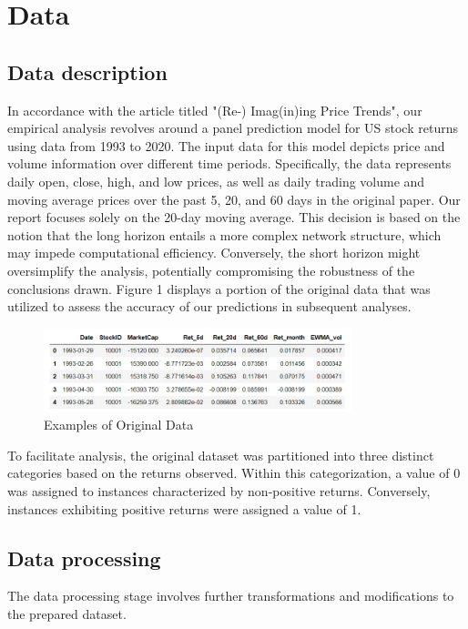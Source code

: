 \documentclass{article}
\begin{document}
\section{Data}
\subsection{Data description}

In accordance with the article titled "(Re-) Imag(in)ing Price Trends", our empirical analysis revolves around a panel prediction model for US stock returns using data from 1993 to 2020. The input data for this model depicts price and volume information over different time periods. Specifically, the data represents daily open, close, high, and low prices, as well as daily trading volume and moving average prices over the past 5, 20, and 60 days in the original paper. Our report focuses solely on the 20-day moving average. This decision is based on the notion that the long horizon entails a more complex network structure, which may impede computational efficiency. Conversely, the short horizon might oversimplify the analysis, potentially compromising the robustness of the conclusions drawn. Figure 1 displays a portion of the original data that was utilized to assess the accuracy of our predictions in subsequent analyses.

\vspace{10pt}
\begin{figure}[H]
	\centering
	\includegraphics[width=0.8\textwidth]{1_2Examples of Original Data.jpg}
	\caption{Examples of Original Data}
\end{figure}

To facilitate analysis, the original dataset was partitioned into three distinct categories based on the returns observed. Within this categorization, a value of 0 was assigned to instances characterized by non-positive returns. Conversely, instances exhibiting positive returns were assigned a value of 1.

\subsection{Data processing}
The data processing stage involves further transformations and modifications to the prepared dataset. 
\end{document}
